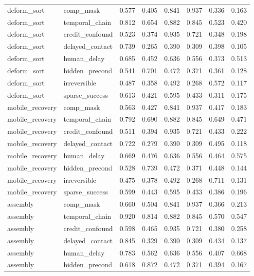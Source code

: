 \documentclass{article}
\begin{document}
\begin{longtable}{@{}llrrrrrr@{}}
deform\_sort & comp\_mask & 0.577 & 0.405 & 0.841 & 0.937 & 0.336 & 0.163 \\
deform\_sort & temporal\_chain & 0.812 & 0.654 & 0.882 & 0.845 & 0.523 & 0.420 \\
deform\_sort & credit\_confound & 0.523 & 0.374 & 0.935 & 0.721 & 0.348 & 0.198 \\
deform\_sort & delayed\_contact & 0.739 & 0.265 & 0.390 & 0.309 & 0.398 & 0.105 \\
deform\_sort & human\_delay & 0.685 & 0.452 & 0.636 & 0.556 & 0.373 & 0.513 \\
deform\_sort & hidden\_precond & 0.541 & 0.701 & 0.472 & 0.371 & 0.361 & 0.128 \\
deform\_sort & irreversible & 0.487 & 0.358 & 0.492 & 0.268 & 0.572 & 0.117 \\
deform\_sort & sparse\_success & 0.613 & 0.421 & 0.595 & 0.433 & 0.311 & 0.175 \\
mobile\_recovery & comp\_mask & 0.563 & 0.427 & 0.841 & 0.937 & 0.417 & 0.183 \\
mobile\_recovery & temporal\_chain & 0.792 & 0.690 & 0.882 & 0.845 & 0.649 & 0.471 \\
mobile\_recovery & credit\_confound & 0.511 & 0.394 & 0.935 & 0.721 & 0.433 & 0.222 \\
mobile\_recovery & delayed\_contact & 0.722 & 0.279 & 0.390 & 0.309 & 0.495 & 0.118 \\
mobile\_recovery & human\_delay & 0.669 & 0.476 & 0.636 & 0.556 & 0.464 & 0.575 \\
mobile\_recovery & hidden\_precond & 0.528 & 0.739 & 0.472 & 0.371 & 0.448 & 0.144 \\
mobile\_recovery & irreversible & 0.475 & 0.378 & 0.492 & 0.268 & 0.711 & 0.131 \\
mobile\_recovery & sparse\_success & 0.599 & 0.443 & 0.595 & 0.433 & 0.386 & 0.196 \\
assembly & comp\_mask & 0.660 & 0.504 & 0.841 & 0.937 & 0.366 & 0.213 \\
assembly & temporal\_chain & 0.920 & 0.814 & 0.882 & 0.845 & 0.570 & 0.547 \\
assembly & credit\_confound & 0.598 & 0.465 & 0.935 & 0.721 & 0.380 & 0.258 \\
assembly & delayed\_contact & 0.845 & 0.329 & 0.390 & 0.309 & 0.434 & 0.137 \\
assembly & human\_delay & 0.783 & 0.562 & 0.636 & 0.556 & 0.407 & 0.668 \\
assembly & hidden\_precond & 0.618 & 0.872 & 0.472 & 0.371 & 0.394 & 0.167 \\

\end{longtable}
\end{document}
